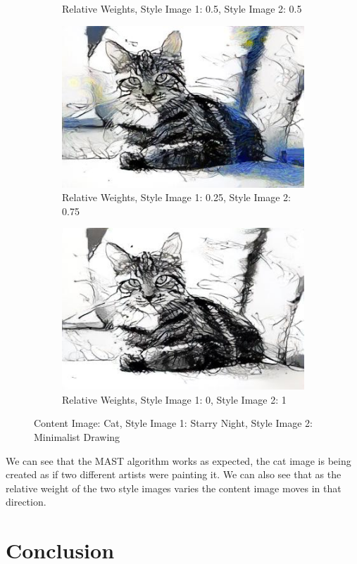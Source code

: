 \documentclass{article}
\begin{document}
\begin{figure}[H]
\begin{subfigure}{.5\textwidth}
  \caption{Relative Weights, Style Image 1: 0.5, Style Image 2: 0.5}
  \label{fig:sfig3}
\end{subfigure}
\begin{subfigure}{.5\textwidth}
  \centering
  \includegraphics[width=.8\linewidth]{i75}
  \caption{Relative Weights, Style Image 1: 0.25, Style Image 2: 0.75}
  \label{fig:sfig4}
\end{subfigure}
\begin{subfigure}{.5\textwidth}
  \centering
  \includegraphics[width=.8\linewidth]{i1}
  \caption{Relative Weights, Style Image 1: 0, Style Image 2: 1}
  \label{fig:sfig5}
\end{subfigure}
\caption{Content Image: Cat, Style Image 1: Starry Night, Style Image 2: Minimalist Drawing}
\label{fig:fig}
\end{figure}

We can see that the MAST algorithm works as expected, the cat image is being created as if two different artists were painting it. We can also see that as the relative weight of the two style images varies the content image moves in that direction.

\section{Conclusion}
\end{document}
